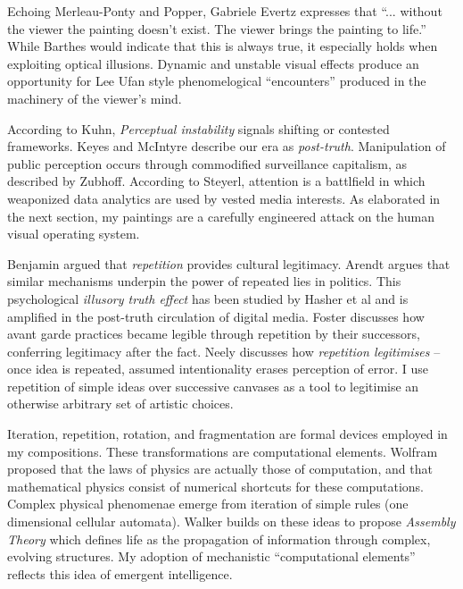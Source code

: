 \documentclass[12pt]{article}
\begin{document}
Echoing Merleau-Ponty\cite{merleauPonty1962phenomenology} and
Popper\cite{popper1972objective}, Gabriele Evertz expresses that
``... without the viewer the painting doesn't exist. The viewer brings
the painting to life.''\cite{evertz09documentary} While Barthes
would indicate that this is always true,\cite{barthes1977death} it
especially holds when exploiting optical illusions. Dynamic and
unstable visual effects produce an opportunity for Lee Ufan style
phenomelogical ``encounters''\cite[p. 52-6]{encounter} produced in
the machinery of the viewer's mind.

According to Kuhn, \emph{Perceptual instability} signals shifting or
contested frameworks.\cite[p. 64]{kuhn1970structure}
Keyes\cite{keyes2004posttruth} and
McIntyre\cite{mcintyre2018posttruth} describe our era as
\emph{post-truth}.  Manipulation of public perception occurs through
commodified surveillance capitalism, as described
by Zubhoff\cite{zuboff2019surveillance}. According to
Steyerl\cite{steyerl2016sea}, attention is a battlfield in which
weaponized data analytics are used by vested media interests. As
elaborated in the next section, my paintings are a carefully
engineered attack on the human visual operating system.

Benjamin argued that \emph{repetition} provides cultural
legitimacy.\cite{benjamin1935kunstwerk} Arendt argues that similar
mechanisms underpin the power of repeated lies in
politics.\cite{arendt1972lying} This psychological \emph{illusory
  truth effect} has been studied by Hasher et
al\cite{hasher1977frequency} and is amplified in the
post-truth\cite{keyes2004posttruth,mcintyre2018posttruth} circulation
of digital
media\cite{zuboff2019surveillance}. Foster\cite[p. 29-30]{foster1996return}
discusses how avant garde practices became legible through repetition
by their successors, conferring legitimacy after the fact. Neely
discusses how \emph{repetition legitimises} -- once idea is repeated,
assumed intentionality erases perception of
error.\cite{neely-repetition} I use repetition of simple ideas over
successive canvases as a tool to legitimise an otherwise arbitrary set
of artistic choices.

Iteration, repetition, rotation, and fragmentation are formal devices
employed in my compositions. These transformations are computational
elements. Wolfram proposed that the laws of physics
are actually those of computation, and that mathematical physics
consist of numerical shortcuts for these computations.\cite{wolfram1984} Complex
physical phenomenae emerge from iteration of simple rules
(one dimensional cellular automata)\cite{wolfram}. 
Walker builds on these ideas to propose
\emph{Assembly Theory} which defines life as the propagation of
information through complex, evolving structures.\cite{walker2024life} My adoption of
mechanistic ``computational elements'' reflects this idea of
emergent intelligence.
\end{document}

